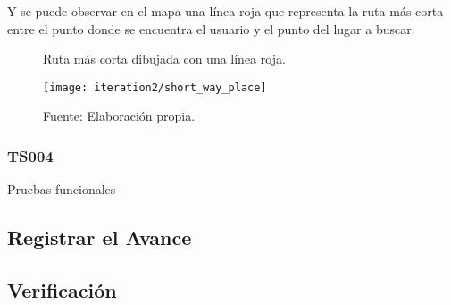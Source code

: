 %

Y se puede observar en el mapa una línea roja que representa la ruta más corta entre el punto donde se encuentra el usuario y el punto del lugar a buscar.

\begin{figure}[H]
  \begin{center}
    \caption{Ruta más corta dibujada con una línea roja.}
    \label{fig:short_way_place}
    \texttt{[image: iteration2/short\_way\_place]}
    \caption*{Fuente: Elaboración propia.}
  \end{center}
\end{figure}

\subsubsection{TS004}
\label{subs:TS004}

Pruebas funcionales

\subsection{Registrar el Avance}
\label{sub:iteracion2_avance}

\subsection{Verificación}
\label{sub:iteracion2_verificacion}
